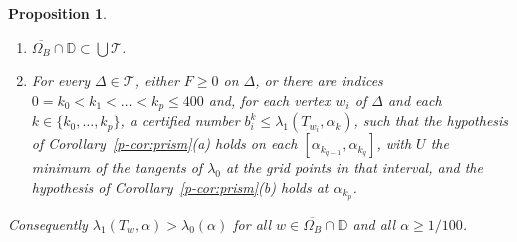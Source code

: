 \documentclass[11pt]{article}
\newtheorem{proposition}[theorem]{Proposition}
\theoremstyle{remark}
\begin{document}
\begin{proposition}\label{p-prop:middle}
\begin{enumerate}
\item[\textup{(a)}] $\overline{\Omega_B}\cap\mathbb D\subset\bigcup\mathcal T$.
\item[\textup{(b)}] For every $\Delta\in\mathcal T$, either $F\ge0$ on $\Delta$, or there are
indices $0=k_0<k_1<\dots<k_p\le400$ and, for each vertex $w_i$ of $\Delta$ and each
$k\in\{k_0,\dots,k_p\}$, a certified number $b_i^k\le\lambda_1(T_{w_i},\alpha_k)$, such that
the hypothesis of Corollary~\ref{p-cor:prism}\textup{(a)} holds on each
$[\alpha_{k_{q-1}},\alpha_{k_q}]$, with $U$ the minimum of the tangents of $\lambda_0$ at the
grid points in that interval, and the hypothesis of Corollary~\ref{p-cor:prism}\textup{(b)}
holds at $\alpha_{k_p}$.
\end{enumerate}
Consequently $\lambda_1(T_w,\alpha)>\lambda_0(\alpha)$ for all $w\in\overline{\Omega_B}\cap\mathbb D$
and all $\alpha\ge1/100$.
\end{proposition}
\end{document}
